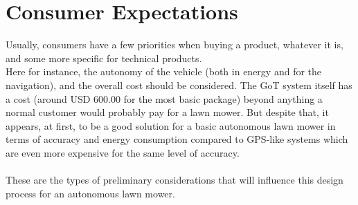 \section{Consumer Expectations}
Usually, consumers have a few priorities when buying a product, whatever it is, and some more specific for technical products.\\
Here for instance, the autonomy of the vehicle (both in energy and for the navigation), and the overall cost should be considered. The GoT system itself has a cost (around USD 600.00 for the most basic package) beyond anything a normal customer would probably pay for a lawn mower. But despite that, it appears, at first, to be a good solution for a basic autonomous lawn mower in terms of accuracy and energy consumption compared to GPS-like systems which are even more expensive for the same level of accuracy. \\\\
These are the types of preliminary considerations that will influence this design process for an autonomous lawn mower.
